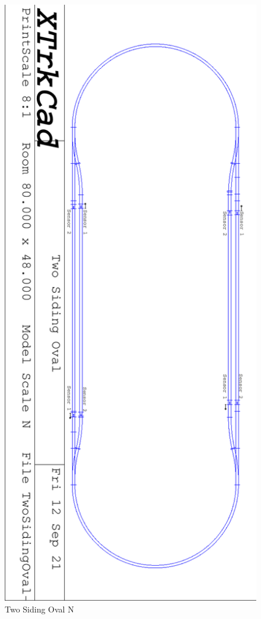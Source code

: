 \begin{figure}[hbpt]
\begin{centering}
\includegraphics[angle=90,width=5in]{TwoSidingOval-N.pdf}
\caption{Two Siding Oval N}
\label{fig:TheLayout:TwoSidingOval-N}
\end{centering}
\end{figure}
